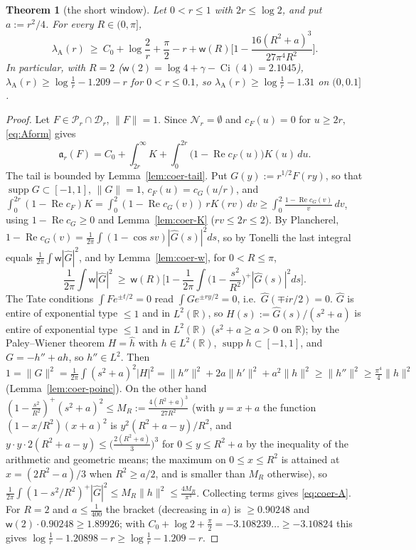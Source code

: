 \documentclass[10pt]{amsart}
\newtheorem{theorem}{Theorem}[section]
\theoremstyle{definition}
\theoremstyle{remark}
\newcommand{\R}{\mathbb R}
\newcommand{\Rel}{\operatorname{Re}}
\newcommand{\supp}{\operatorname{supp}}
\newcommand{\cF}{c_F}
\begin{document}
\begin{theorem}[the short window]\label{thm:coer-A}
Let $0<r\le1$ with $2r\le\log2$, and put $a:=r^2/4$. For every $R\in(0,\pi]$,
\begin{equation}\label{eq:coer-A}
\lambda_{\mathrm A}(r)\ \ge\ C_0+\log\frac2r+\frac\pi2-r+\mathsf w(R)\Big[1-\frac{16(R^2+a)^3}{27\pi^4R^2}\Big].
\end{equation}
In particular, with $R=2$ ($\mathsf w(2)=\log4+\gamma-\operatorname{Ci}(4)=2.1045$),
$\lambda_{\mathrm A}(r)\ge\log\frac1r-1.209-r$ for $0<r\le0.1$, so $\lambda_{\mathrm A}(r)\ge\log\frac1r-1.31$ on $(0,0.1]$.
\end{theorem}
\begin{proof}
Let $F\in\mathcal P_r\cap\mathcal D_r$, $\|F\|=1$. Since $\mathcal N_r=\emptyset$ and $\cF(u)=0$ for $u\ge2r$, \eqref{eq:Aform} gives
\[
\mathfrak a_r(F)=C_0+\int_{2r}^\infty K+\int_0^{2r}\big(1-\Rel\cF(u)\big)K(u)\,du .
\]
The tail is bounded by Lemma~\ref{lem:coer-tail}. Put $G(y):=r^{1/2}F(ry)$, so that $\supp G\subset[-1,1]$, $\|G\|=1$,
$\cF(u)=c_G(u/r)$, and $\int_0^{2r}(1-\Rel\cF)K=\int_0^2(1-\Rel c_G(v))\,rK(rv)\,dv\ge\int_0^2\frac{1-\Rel c_G(v)}v\,dv$, using
$1-\Rel c_G\ge0$ and Lemma~\ref{lem:coer-K} ($rv\le2r\le2$). By Plancherel, $1-\Rel c_G(v)=\frac1{2\pi}\int(1-\cos sv)|\widehat G(s)|^2ds$,
so by Tonelli the last integral equals $\frac1{2\pi}\int\mathsf w|\widehat G|^2$, and by Lemma~\ref{lem:coer-w}, for $0<R\le\pi$,
\[
\frac1{2\pi}\int\mathsf w|\widehat G|^2\ \ge\ \mathsf w(R)\Big[1-\frac1{2\pi}\int\Big(1-\frac{s^2}{R^2}\Big)^+|\widehat G(s)|^2ds\Big].
\]
The Tate conditions $\int Fe^{\pm t/2}=0$ read $\int Ge^{\pm ry/2}=0$, i.e.\ $\widehat G(\mp ir/2)=0$. $\widehat G$ is entire of
exponential type $\le1$ and in $L^2(\R)$, so $H(s):=\widehat G(s)/(s^2+a)$ is entire of exponential type $\le1$ and in $L^2(\R)$
($s^2+a\ge a>0$ on $\R$); by the Paley--Wiener theorem $H=\widehat h$ with $h\in L^2(\R)$, $\supp h\subset[-1,1]$, and
$G=-h''+ah$, so $h''\in L^2$. Then
$1=\|G\|^2=\frac1{2\pi}\int(s^2+a)^2|H|^2=\|h''\|^2+2a\|h'\|^2+a^2\|h\|^2\ge\|h''\|^2\ge\frac{\pi^4}4\|h\|^2$
(Lemma~\ref{lem:coer-poinc}). On the other hand $(1-\frac{s^2}{R^2})^+(s^2+a)^2\le M_R:=\frac{4(R^2+a)^3}{27R^2}$ (with
$y=x+a$ the function $(1-x/R^2)(x+a)^2$ is $y^2(R^2+a-y)/R^2$, and $y\cdot y\cdot2(R^2+a-y)\le\bigl(\tfrac{2(R^2+a)}3\bigr)^3$ for
$0\le y\le R^2+a$ by the inequality of the arithmetic and geometric means; the maximum on $0\le x\le R^2$ is attained at
$x=(2R^2-a)/3$ when $R^2\ge a/2$, and is smaller than $M_R$ otherwise), so
$\frac1{2\pi}\int(1-s^2/R^2)^+|\widehat G|^2\le M_R\|h\|^2\le\frac{4M_R}{\pi^4}$. Collecting terms gives \eqref{eq:coer-A}. For
$R=2$ and $a\le\frac1{400}$ the bracket (decreasing in $a$) is $\ge0.90248$ and $\mathsf w(2)\cdot0.90248\ge1.89926$; with
$C_0+\log2+\frac\pi2=-3.108239\ldots\ge-3.10824$ this gives $\log\frac1r-1.20898-r\ge\log\frac1r-1.209-r$.
\end{proof}
\end{document}
